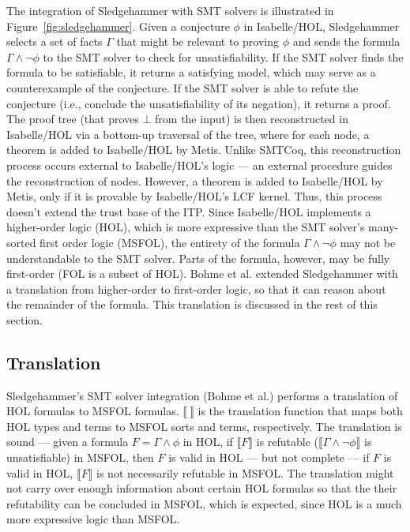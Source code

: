 \documentclass[11pt]{article}
\begin{document}
	The integration of Sledgehammer 
	with SMT solvers is illustrated in 
	Figure~\ref{fig:sledgehammer}. Given 
	a conjecture $\phi$ in 
	Isabelle/HOL, Sledgehammer 
	selects a set of facts 
	$\Gamma$ that might be relevant 
	to proving $\phi$ and sends
	the formula $\Gamma \land \neg 
	\phi$ to the SMT solver to check 
	for unsatisfiability. If the SMT 
	solver finds the formula to be 
	satisfiable, it returns a satisfying 
	model, which may serve as a 
	counterexample 
	of the conjecture. If the SMT 
	solver is able to refute the 
	conjecture (i.e., conclude 
	the unsatisfiability of its 
	negation), it returns 
	a proof. The proof tree (that
	proves $\bot$ from the 
	input) is then reconstructed in 
	Isabelle/HOL via a bottom-up 
	traversal of the tree, where 
	for each node, a theorem is 
	added to Isabelle/HOL by Metis.
	Unlike SMTCoq, this reconstruction
	process occurs external to 
	Isabelle/HOL's logic ---
	an external procedure guides 
	the reconstruction of nodes. 
	However, a theorem is added to 
	Isabelle/HOL by Metis, only if it 
	is provable by Isabelle/HOL's LCF 
	kernel. Thus, this process doesn't
	extend the trust base of the ITP.
	Since Isabelle/HOL 
	implements a higher-order logic 
	(HOL), which 
	is more expressive than 
	the SMT solver's many-sorted
	first order logic (MSFOL),
	the entirety of the formula
	$\Gamma \land \neg \phi$ may not 
	be understandable to the SMT 
	solver. Parts of the formula,
	however, may be fully 
	first-order (FOL is 
	a subset of HOL). Bohme et al.
	extended Sledgehammer with 
	a translation from higher-order 
	to first-order logic, so that 
	it can reason about the remainder
	of the formula. This translation
	is discussed in the rest of this 
	section.
	
	\subsection{Translation}
	\label{sec:trans}
	Sledgehammer's SMT solver 
	integration (Bohme et al.) performs 
	a translation 
	of HOL formulas to MSFOL formulas.
	$\llbracket\ \rrbracket$
	is the translation function 
	that maps both HOL types and 
	terms to MSFOL sorts and terms,
	respectively.
	The translation is sound --- 
	given a formula 
	$F = \Gamma \land \phi$ in HOL, if 
	$\llbracket F \rrbracket$ is refutable 
	($\llbracket \Gamma \land \neg
	\phi \rrbracket$
	is unsatisfiable) in MSFOL, then 
	$F$	is valid in HOL --- but not 
	complete --- if $F$ is valid in 
	HOL, $\llbracket F \rrbracket$ is 
	not necessarily refutable in MSFOL. 
	The translation might not carry over 
	enough information about certain HOL 
	formulas so that the their 
	refutability can be concluded in 
	MSFOL, which is	expected, since HOL 
	is a much more expressive logic than 
	MSFOL. 
	
\end{document}
